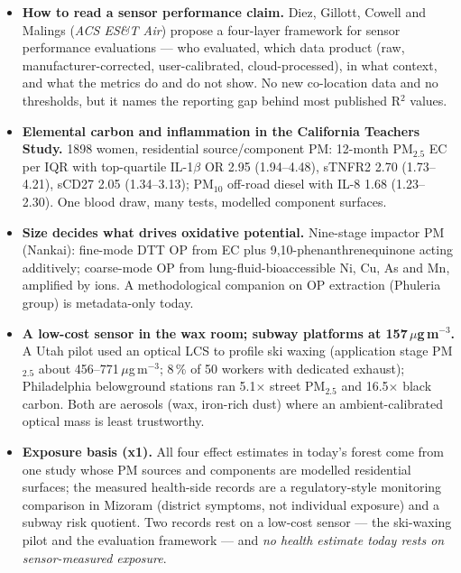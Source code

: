 \documentclass[10pt]{article}
\begin{document}
\footnotesize
\begin{itemize}

\item \textbf{How to read a sensor performance claim.} Diez, Gillott, Cowell and Malings (\textit{ACS ES\&T Air}) propose a four-layer framework for sensor performance evaluations --- who evaluated, which data product (raw, manufacturer-corrected, user-calibrated, cloud-processed), in what context, and what the metrics do and do not show. No new co-location data and no thresholds, but it names the reporting gap behind most published R$^2$ values.

\item \textbf{Elemental carbon and inflammation in the California Teachers Study.} 1898 women, residential source/component PM: 12-month PM$_{2.5}$ EC per IQR with top-quartile IL-1$\beta$ OR 2.95 (1.94--4.48), sTNFR2 2.70 (1.73--4.21), sCD27 2.05 (1.34--3.13); PM$_{10}$ off-road diesel with IL-8 1.68 (1.23--2.30). One blood draw, many tests, modelled component surfaces.

\item \textbf{Size decides what drives oxidative potential.} Nine-stage impactor PM (Nankai): fine-mode DTT OP from EC plus 9,10-phenanthrenequinone acting additively; coarse-mode OP from lung-fluid-bioaccessible Ni, Cu, As and Mn, amplified by ions. A methodological companion on OP extraction (Phuleria group) is metadata-only today.

\item \textbf{A low-cost sensor in the wax room; subway platforms at 157\,$\mu$g\,m$^{-3}$.} A Utah pilot used an optical LCS to profile ski waxing (application stage PM$_{2.5}$ about 456--771\,$\mu$g\,m$^{-3}$; 8\,\% of 50 workers with dedicated exhaust); Philadelphia belowground stations ran 5.1$\times$ street PM$_{2.5}$ and 16.5$\times$ black carbon. Both are aerosols (wax, iron-rich dust) where an ambient-calibrated optical mass is least trustworthy.

\item \textbf{Exposure basis (x1).} All four effect estimates in today's forest come from one study whose PM sources and components are modelled residential surfaces; the measured health-side records are a regulatory-style monitoring comparison in Mizoram (district symptoms, not individual exposure) and a subway risk quotient. Two records rest on a low-cost sensor --- the ski-waxing pilot and the evaluation framework --- and \emph{no health estimate today rests on sensor-measured exposure}.

\end{itemize}
\end{document}
